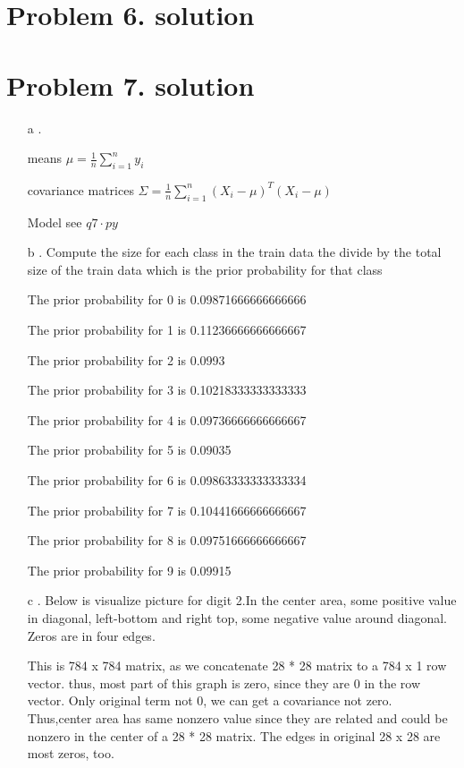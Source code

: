 \documentclass[11pt]{article}
\begin{document}
\section*{Problem 6. solution}


\section*{Problem 7. solution}
\begin{itemize}
\item[a].

means $\mu =  \frac{1}{n}\sum_{i=1}^{n} y_i$

covariance matrices $\Sigma = \frac{1}{n }\sum_{i=1}^{n}(X_i - \mu)^T(X_i - \mu)$

Model see $q7\cdot py$
\item[b].
Compute the size for each class in the train data the divide by the total size of the train data which is the prior probability for that class

The prior probability for  0 is 0.09871666666666666

The prior probability for  1 is 0.11236666666666667

The prior probability for  2 is 0.0993

The prior probability for  3 is 0.10218333333333333

The prior probability for  4 is 0.09736666666666667

The prior probability for  5 is 0.09035

The prior probability for  6 is 0.09863333333333334

The prior probability for  7 is 0.10441666666666667

The prior probability for  8 is 0.09751666666666667

The prior probability for  9 is 0.09915
\item[c].
Below is visualize picture for digit 2.In the center area, some positive value in diagonal, left-bottom and right top, some negative value around diagonal. Zeros are in four edges.

This is 784 x 784 matrix, as we concatenate 28 * 28 matrix to a 784 x 1 row vector. thus, most part of this graph is zero, since they are 0 in the row vector. Only original term not 0, we can get a covariance not zero. Thus,center area has same nonzero value since they are related and could be nonzero in the center of a 28 * 28 matrix. The edges in original  28 x 28 are most zeros, too.


\end{itemize}
\end{document}

